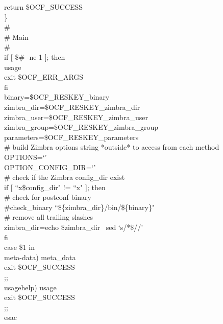 \documentclass[a4paper, 12pt]{book}
\begin{document}
    \indent return \$OCF\_SUCCESS\\
\}\\

\noindent \#\\
\# Main\\
\#\\

\noindent if [ \$\# -ne 1 ]; then\\
    \indent usage\\
    \indent exit \$OCF\_ERR\_ARGS\\
fi\\

\noindent binary=\$OCF\_RESKEY\_binary\\
zimbra\_dir=\$OCF\_RESKEY\_zimbra\_dir\\
zimbra\_user=\$OCF\_RESKEY\_zimbra\_user\\
zimbra\_group=\$OCF\_RESKEY\_zimbra\_group\\
parameters=\$OCF\_RESKEY\_parameters\\

\noindent \# build Zimbra options string *outside* to access from each method\\
OPTIONS=`'\\
OPTION\_CONFIG\_DIR=`'\\

\noindent \# check if the Zimbra config\_dir exist\\
if [ ``x\$config\_dir" != ``x" ]; then\\
    \indent \# check for postconf binary\\
    \indent \#check\_binary ``\$\{zimbra\_dir\}/bin/\$\{binary\}"\\

    \# remove all trailing slashes\\
    \indent zimbra\_dir=\textasciigrave echo \$zimbra\_dir \textbar \ sed `s/\/*\$//'\textasciigrave \\
fi\\

\noindent case \$1 in\\
    \indent meta-data)  meta\_data\\
                \indent \indent \indent \indent exit \$OCF\_SUCCESS\\
                \indent \indent \indent \indent ;;\\

    \indent usage\textbar help) usage\\
                \indent \indent \indent \indent exit \$OCF\_SUCCESS\\
                \indent \indent \indent \indent ;;\\
\noindent esac\\
\end{document}
